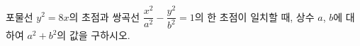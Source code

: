 포물선 $y^2=8x$의 초점과 쌍곡선 $\dfrac{x^2}{a^2}-\dfrac{y^2}{b^2}=1$의 한 초점이 일치할 때, 상수 $a$, $b$에 대하여 $a^2+b^2$의 값을 구하시오.
